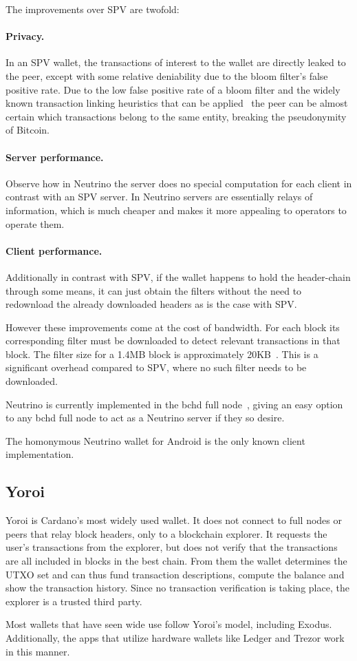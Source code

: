 

The improvements over SPV are twofold:
\paragraph{Privacy.} In an SPV wallet, the transactions of interest to the wallet are directly leaked to the peer, except with some relative deniability due to the bloom filter's false positive rate. Due to the low false positive rate of a bloom filter and the widely known transaction linking heuristics that can be applied~\cite{meiklejohn2013fistful,gervais2014privacy}
the peer can be almost certain which transactions belong to the same entity, breaking the pseudonymity of Bitcoin.
\paragraph{Server performance.} Observe how in Neutrino the server does no special computation for each client in contrast with an SPV server. In Neutrino servers are essentially relays of information, which is much cheaper and makes it more appealing to operators to operate them.
\paragraph{Client performance.} Additionally in contrast with SPV, if the wallet happens to hold the header-chain through some means, it can just obtain the filters without the need to redownload the already downloaded headers as is the case with SPV.

However these improvements come at the cost of bandwidth. For each block its corresponding filter must be downloaded to detect relevant transactions in that block. The filter size for a 1.4MB block is approximately 20KB~\cite{jimmysong}. This is a significant overhead compared to SPV, where no such filter needs to be downloaded.

Neutrino is currently implemented in the bchd full node~\cite{bchd}, giving an easy option to any bchd full node to act as a Neutrino server if they so desire.

The homonymous Neutrino wallet for Android is the only known client implementation.

\subsection{Yoroi}
Yoroi is Cardano's most widely used wallet. It does not connect to full nodes or peers that relay block headers, only to a blockchain explorer. It requests the user's transactions from the explorer, but does not verify that the transactions are all included in blocks in the best chain. From them the wallet determines the UTXO set and can thus fund transaction descriptions, compute the balance and show the transaction history. Since no transaction verification is taking place, the explorer is a trusted third party.

Most wallets that have seen wide use follow Yoroi's model, including Exodus. Additionally, the apps that utilize hardware wallets like Ledger and Trezor work in this manner.
